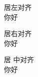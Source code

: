 \documentclass{article}
\begin{document}
 
	\begin{flushleft}
		居左对齐\\
		你好
	\end{flushleft}

	\begin{flushright}
		居右对齐\\
		你好
	\end{flushright}
		
	\begin{center}
		居
		中对齐\\
		你好
	\end{center}
\end{document}
